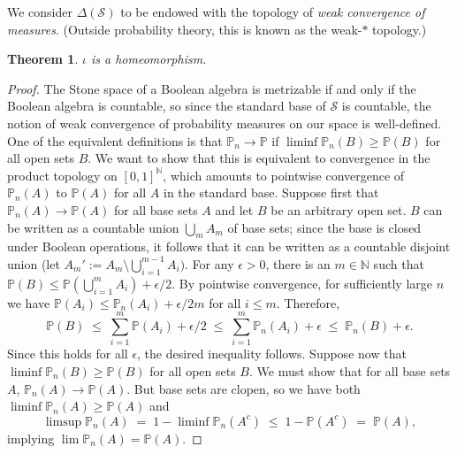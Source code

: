 \documentclass[12pt]{article}
\newcommand{\PP}{\mathbb{P}}
\newcommand{\NN}{\mathbb{N}}
\newcommand{\cS}{\mathcal{S}}
\theoremstyle{plain}
\newtheorem{theorem}{Theorem}[subsection]
\theoremstyle{definition}
\theoremstyle{remark}
\begin{document}
We consider $\Delta(\cS)$ to be endowed with the topology of \emph{weak convergence of measures}. (Outside probability theory, this is known as the weak-$*$ topology.)
\begin{theorem}
$\iota$ is a homeomorphism.
\end{theorem}
\begin{proof}
The Stone space of a Boolean algebra is metrizable if and only if the Boolean algebra is countable, so since the standard base of $\cS$ is countable, the notion of weak convergence of probability measures on our space is well-defined. One of the equivalent definitions is that $\PP_n\to\PP$ if $\liminf\PP_n(B)\ge\PP(B)$ for all open sets $B$. We want to show that this is equivalent to convergence in the product topology on $[0,1]^\NN$, which amounts to pointwise convergence of $\PP_n(A)$ to $\PP(A)$ for all $A$ in the standard base.
Suppose first that $\PP_n(A)\to\PP(A)$ for all base sets $A$ and let $B$ be an arbitrary open set. $B$ can be written as a countable union $\textstyle\bigcup_m A_m$ of base sets; since the base is closed under Boolean operations, it follows that it can be written as a countable disjoint union (let $\textstyle A_m' := A_m\setminus\bigcup_{i=1}^{m-1}A_i)$. For any $\epsilon>0$, there is an $m\in\mathbb{N}$ such that $\textstyle\PP(B)\le\PP(\bigcup_{i=1}^m A_i)+\epsilon/2$. By pointwise convergence, for sufficiently large $n$ we have $\PP(A_i)\le\PP_n(A_i) + \epsilon/2m$ for all $i\le m$. Therefore,
\[
\textstyle\PP(B)\;\le\;\sum_{i=1}^m\PP(A_i)+\epsilon/2\;\le\;\sum_{i=1}^m\PP_n(A_i) + \epsilon\;\le\;\PP_n(B)+\epsilon.
\]
Since this holds for all $\epsilon$, the desired inequality follows.
Suppose now that $\liminf\PP_n(B)\ge\PP(B)$ for all open sets $B$. We must show that for all base sets $A$, $\PP_n(A)\to\PP(A)$. But base sets are clopen, so we have both $\liminf\PP_n(A)\ge\PP(A)$ and
\[
\limsup\PP_n(A) \;=\; 1-\liminf\PP_n(A^c) \;\le\; 1 - \PP(A^c) \;=\; \PP(A),
\]
implying $\lim\PP_n(A) = \PP(A)$.
\end{proof}
\end{document}
